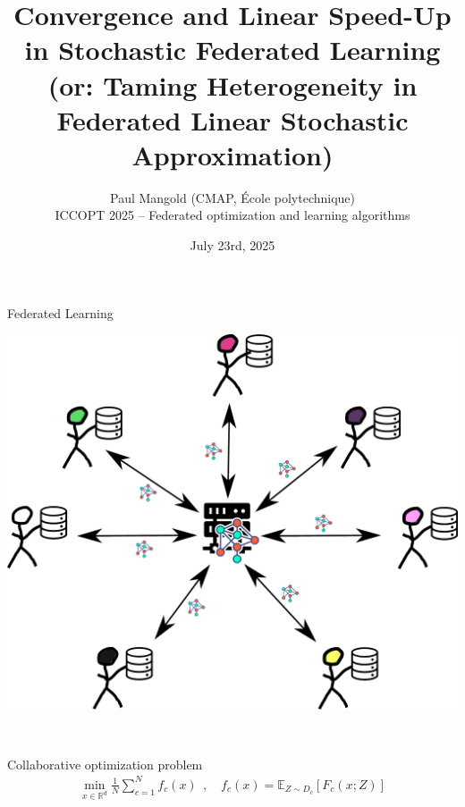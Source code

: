 \documentclass[aspectratio=169,12pt]{beamer}
\title{\LARGE Convergence and Linear Speed-Up in Stochastic Federated Learning  \\[0.5em]
\normalsize (or: Taming Heterogeneity in Federated Linear Stochastic Approximation)
\vspace{0em}}
\author{
  Paul Mangold (CMAP, École polytechnique) \\[0.5em]
  ICCOPT 2025 --  Federated optimization and learning algorithms
}
\institute{}
\date{July 23rd, 2025}
\begin{document}

\begin{frame}[plain]
  \vspace{3.5em}
  \titlepage
\end{frame}
\addtocounter{framenumber}{-1}



\begin{frame}[t]{Federated Learning}
\vspace{0.5em}
  \begin{minipage}{0.35\linewidth}
    \begin{center}
    \includegraphics[width=\linewidth]{images/federated_learning.pdf} 
    \end{center}
    
  \end{minipage}~~~~~~%
  \begin{minipage}{0.5\linewidth}

    \begin{center}
      Collaborative optimization problem
      \begin{align*}
        \min_{x \in \mathbb{R}^d} 
        \frac{1}{N} \sum_{c=1}^N f_c(x)
        ~~,
        \quad 
        f_c(x)
        = \mathbb{E}_{Z \sim D_c} [ F_c(x; Z) ]
      \end{align*}
    \end{center}
      

\end{minipage}
\end{frame}
\end{document}
